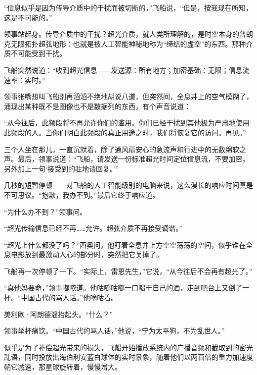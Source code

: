 \documentclass[AutoFakeBold=true]{book}
\begin{document}
``信息似乎是因为传导介质中的干扰而被切断的，''飞船说，``但是，按我现在所知，这是不可能的。''

领事站起身。{\kaishu 传导介质中的干扰？}超光介质，就人类所理解的，是时空本身的普朗克无限拓扑超弦地形：也就是被人工智能神秘地称为``缔结的虚空''的东西。那种介质不可能受到干扰。

飞船突然说道：``收到超光信息——发送源：所有地方；加密基础：无限；信息流速率：实时。''

领事张嘴想叫飞船别再滔滔不绝地胡说八道，但突然间，全息井上的空气模糊了，涌现出某种既不是图像也不是数据列的东西，有个声音说道：

{\heiti ``从今往后，此频段将不再允许你们的滥用。你们已经干扰到其他极为严肃地使用此频段的人。当你们明白此频段的真正用途之时，我们将恢复它的访问。再见。''}

三个人坐在那儿，一直沉默着，除了通风扇安心的急流声和行进中的无数绵软之声。最后，领事说道：``飞船，请发送一份标准超光时间定位信息流，不要加密。另外加上一句`接受到的驻地请回复。'''

几秒的短暂停顿——对飞船的人工智能级别的电脑来说，这么漫长的响应时间真是不可思议。``抱歉，我办不到。''最后它终于响应道。

``为什么办不到？''领事问。

``超光传输信息已经不再……允许。超弦介质不再接受调谐。''

``超光上什么都没了吗？''西奥问，他盯着全息井上方空空荡荡的空间，似乎谁在全息电影放到最激动人心的部分时，突然把它关掉了。

飞船再一次停顿了一下。``实际上，雷恩先生，''它说，``从今往后不会再有超光了。''

``真他妈要命，''领事嘟哝道。他咕嘟咕嘟一口喝干自己的酒，走到吧台上又倒了一杯。``中国古代的骂人话。''他嘀咕着。

美利欧·阿朗德淄抬起头。``什么？''

领事举杯痛饮。``中国古代的骂人话，''他说，``宁为太平狗，不为乱世人。''

似乎是为了补偿超光带来的损失，飞船开始播放系统内的广播音频和截取到的密光乱语，同时投放出海伯利安蓝白球体的实时景象，随着他们以两百倍的重力加速度朝它减速，那星球旋转着，慢慢增大。

\chapter{}
\end{document}
